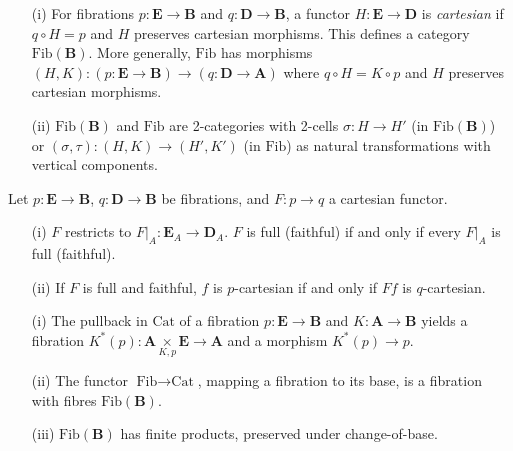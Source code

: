 \documentclass{article}
\begin{document}
\begin{definition}
\label{def:2.4}
\begin{enumerate}
    \item[(i)] For fibrations $p : \mathbf{E} \to \mathbf{B}$ and $q : \mathbf{D} \to \mathbf{B}$, a functor $H : \mathbf{E} \to \mathbf{D}$ is \emph{cartesian} if $q \circ H = p$ and $H$ preserves cartesian morphisms. This defines a category $\text{Fib}(\mathbf{B})$. More generally, $\text{Fib}$ has morphisms $(H, K) : (p : \mathbf{E} \to \mathbf{B}) \to (q : \mathbf{D} \to \mathbf{A})$ where $q \circ H = K \circ p$ and $H$ preserves cartesian morphisms.
    \item[(ii)] $\text{Fib}(\mathbf{B})$ and $\text{Fib}$ are 2-categories with 2-cells $\sigma : H \to H'$ (in $\text{Fib}(\mathbf{B})$) or $(\sigma, \tau) : (H, K) \to (H', K')$ (in $\text{Fib}$) as natural transformations with vertical components.
\end{enumerate}
\end{definition}

\begin{lemma}
\label{lem:2.5}
Let $p : \mathbf{E} \to \mathbf{B}$, $q : \mathbf{D} \to \mathbf{B}$ be fibrations, and $F : p \to q$ a cartesian functor.
\begin{enumerate}
    \item[(i)] $F$ restricts to $\left.F\right|_A : \mathbf{E}_A \to \mathbf{D}_A$. $F$ is full (faithful) if and only if every $\left.F\right|_A$ is full (faithful).
    \item[(ii)] If $F$ is full and faithful, $f$ is $p$-cartesian if and only if $F f$ is $q$-cartesian.
\end{enumerate}
\end{lemma}

\begin{proposition}
\label{prop:2.6}
\begin{enumerate}
    \item[(i)] The pullback in $\text{Cat}$ of a fibration $p : \mathbf{E} \to \mathbf{B}$ and $K : \mathbf{A} \to \mathbf{B}$ yields a fibration $K^*(p) : \mathbf{A} \underset{K, p}{\times} \mathbf{E} \to \mathbf{A}$ and a morphism $K^*(p) \to p$.
    \item[(ii)] The functor $\text{Fib} \to \text{Cat}$, mapping a fibration to its base, is a fibration with fibres $\text{Fib}(\mathbf{B})$.
    \item[(iii)] $\text{Fib}(\mathbf{B})$ has finite products, preserved under change-of-base.
\end{enumerate}
\end{proposition}
\end{document}
